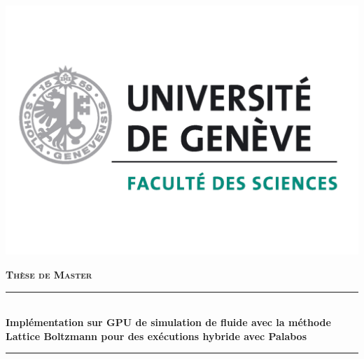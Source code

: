 \newcommand{\HRule}{\rule{\linewidth}{0.5mm}}

\begin{titlepage}
\begin{minipage}{1\textwidth}
	\vspace{-1cm}
	\hspace{-0.048\textwidth}  %
\includegraphics[scale=0.2]{images/logo_uni_sciences.pdf}

	\hspace{0.316\textwidth}
\end{minipage}
\begin{center}



\textsc{\LARGE \textbf{Thèse de Master}}\\[0.5cm]


\HRule \\[0.4cm]
{ 
\Large \textbf{Implémentation sur \textsc{GPU} de simulation de fluide avec la méthode Lattice Boltzmann pour des exécutions hybride avec Palabos}
}\\[0.4cm]

\HRule \\[0.8cm]


\end{center}
\end{titlepage}
